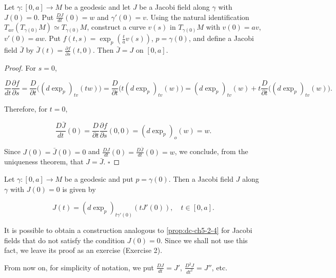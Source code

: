 \begin{proposition}[Proposition 2.4]
  \label{prop:dc-ch5-2-4}
  Let $\gamma:[0,a]\to M$ be a geodesic and let $J$ be a Jacobi field along
  $\gamma$ with $J(0)=0$. Put $\frac{DJ}{dt}(0)=w$ and $\gamma'(0)=v$. Using the
  natural identification $T_{av}(T_{\gamma(0)}M)\simeq T_{\gamma(0)}M$, construct a
  curve $v(s)$ in $T_{\gamma(0)}M$ with $v(0)=av$, $v'(0)=aw$. Put
  $f(t,s)=\exp_p(\frac{t}{a}v(s))$,
  $p=\gamma(0)$, and define a Jacobi field $\bar J$ by
  $\bar J(t)=\frac{\partial f}{\partial s}(t,0)$. Then $\bar J=J$ on $[0,a]$.
\end{proposition}
\begin{proof}
  For $s=0$,
  
  $$
  \frac{D}{dt}\frac{\partial f}{\partial s}=\frac{D}{\partial t}\big((d\exp_p)_{tv}(tw)\big)
  =\frac{D}{\partial t}\big(t(d\exp_p)_{tv}(w)\big)
  =(d\exp_p)_{tv}(w)+t\frac{D}{\partial t}\big((d\exp_p)_{tv}(w)\big).
  $$
  
  Therefore, for $t=0$,
  
  $$
  \frac{D\bar J}{dt}(0)=\frac{D}{\partial t}\frac{\partial f}{\partial s}(0,0)=(d\exp_p)_o(w)=w.
  $$
  
  Since $J(0)=\bar J(0)=0$ and $\frac{DJ}{dt}(0)=\frac{D\bar J}{dt}(0)=w$, we
  conclude, from the uniqueness theorem, that $J=\bar J$. $\square$
\end{proof}

\begin{corollary}[Corollary 2.5]
  \label{cor:dc-ch5-2-5}
  Let $\gamma:[0,a]\to M$ be a geodesic and put $p=\gamma(0)$. Then a Jacobi field
  $J$ along $\gamma$ with $J(0)=0$ is given by
  
  $$
  J(t)=(d\exp_p)_{t\gamma'(0)}(tJ'(0)),\quad t\in[0,a].
  $$
\end{corollary}

\begin{remark}[Remark 2.6]
  \label{rem:dc-ch5-2-6}
  It is possible to obtain a construction analogous to \cref{prop:dc-ch5-2-4} for Jacobi
  fields that do not satisfy the condition $J(0)=0$. Since we shall not use this
  fact, we leave its proof as an exercise (Exercise 2).
  
  From now on, for simplicity of notation, we put $\frac{DJ}{dt}=J'$,
  $\frac{D^2 J}{dt^2}=J''$, etc.
\end{remark}

